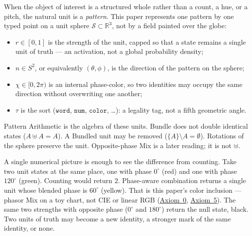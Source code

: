 \documentclass[12pt, a4paper]{article}
\begin{document}
When the object of interest is a structured whole rather than a
count, a hue, or a pitch, the natural unit is a \emph{pattern}.
This paper represents one pattern by one typed point on a unit
sphere $\mathcal{S} \subset \mathbb{R}^3$, not by a field painted over the globe:
\begin{itemize}
    \item $r \in [0, 1]$ is the strength of the unit, capped so that a state remains a single unit of truth --- an activation, not a global probability density;
    \item $\hat n \in S^2$, or equivalently $(\theta, \phi)$, is the direction of the pattern on the sphere;
    \item $\chi \in [0, 2\pi)$ is an internal phase-color, so two identities may occupy the same direction without overwriting one another;
    \item $\tau$ is the sort ($\mathtt{word}$, $\mathtt{num}$, $\mathtt{color}$, \ldots): a legality tag, not a fifth geometric angle.
\end{itemize}
Pattern Arithmetic is the algebra of these units. Bundle does not double identical states ($A \uplus A = A$). A Bundled unit may be removed ($\{A\} \setminus A = \emptyset$). Rotations of the sphere preserve the unit. Opposite-phase Mix is a later reading; it is not $\uplus$.

A single numerical picture is enough to see the difference from counting. Take two unit states at the same place, one with phase $0^\circ$ (red) and one with phase $120^\circ$ (green). Counting would return $2$. Phase-aware combination returns a single unit whose blended phase is $60^\circ$ (yellow). That is this paper's color inclusion --- phasor Mix on a toy chart, not CIE or linear RGB (\hyperref[subsec:axiom0_admissibility]{Axiom~0}, \hyperref[subsec:axiom_interference]{Axiom~5}). The same two strengths with opposite phase ($0^\circ$ and $180^\circ$) return the null state, black. Two units of truth may become a new identity, a stronger mark of the same identity, or none.
\end{document}
